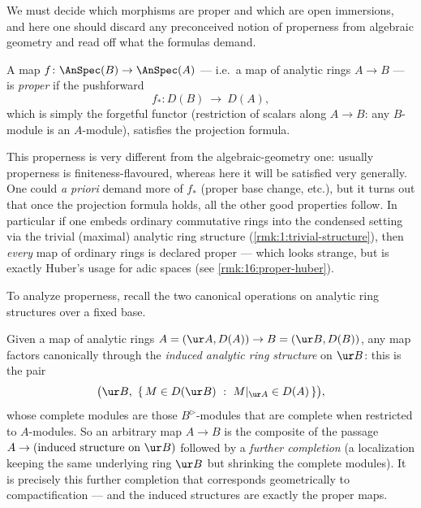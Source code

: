 We must decide which morphisms are proper and which are open immersions, and here one
should discard any preconceived notion of properness from algebraic geometry and read
off what the formulas demand.

\begin{definition}
\label{def:16:proper}
A map $f\colon\AnSpec(B)\to\AnSpec(A)$ --- i.e.\ a map of analytic rings $A\to B$ --- is
\emph{proper} if the pushforward
\begin{equation*}
f_*\colon D(B)\ \longrightarrow\ D(A),
\end{equation*}
which is simply the forgetful functor (restriction of scalars along $A\to B$: any
$B$-module is an $A$-module), satisfies the projection formula.
\end{definition}

\begin{remark}
\label{rmk:16:proper-strange}
This properness is very different from the algebraic-geometry one: usually properness
is finiteness-flavoured, whereas here it will be satisfied very generally. One could
\emph{a priori} demand more of $f_*$ (proper base change, etc.), but it turns out that
once the projection formula holds, all the other good properties follow. In particular
if one embeds ordinary commutative rings into the condensed setting via the trivial
(maximal) analytic ring structure (\cref{rmk:1:trivial-structure}), then \emph{every}
map of ordinary rings is declared proper --- which looks strange, but is exactly
Huber's usage for adic spaces (see \cref{rmk:16:proper-huber}).
\end{remark}

To analyze properness, recall the two canonical operations on analytic ring
structures over a fixed base.

\begin{remark}
\label{rmk:16:induced-structure}
Given a map of analytic rings $A=(\ur A,D(A))\to B=(\ur B,D(B))$, any map factors
canonically through the \emph{induced analytic ring structure} on $\ur B$: this is
the pair
\begin{equation}
\label{eq:16:induced-structure}
\bigl(\ur B,\ \{\,M\in D(\ur B)\ :\ M|_{\ur A}\in D(A)\,\}\bigr),
\end{equation}
whose complete modules are those $B^\triangleright$-modules that are complete when
restricted to $A$-modules. So an arbitrary map $A\to B$ is the composite of the
passage $A\to(\text{induced structure on }\ur B)$ followed by a \emph{further
completion} (a localization keeping the same underlying ring $\ur B$ but shrinking the
complete modules). It is precisely this further completion that corresponds
geometrically to compactification --- and the induced structures are exactly the proper
maps.
\end{remark}

